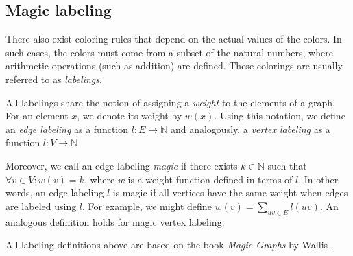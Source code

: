\subsection{Magic labeling}

There also exist coloring rules that depend on the actual values of the colors. In such cases, the colors must come from a subset of the natural numbers, where arithmetic operations (such as addition) are defined. These colorings are usually referred to as \textit{labelings}.

All labelings share the notion of assigning a \textit{weight} to the elements of a graph. For an element $x$, we denote its weight by $w(x)$. Using this notation, we define an \textit{edge labeling} as a function $l : E \rightarrow \mathbb{N}$ and analogously, a \textit{vertex labeling} as a function $l : V \rightarrow \mathbb{N}$

Moreover, we call an edge labeling \textit{magic} if there exists $k \in \mathbb{N}$ such that $\forall v \in V: w(v) = k$, where $w$ is a weight function defined in terms of $l$. In other words, an edge labeling $l$ is magic if all vertices have the same weight when edges are labeled using $l$. For example, we might define $w(v) = \sum_{uv \in E} l(uv)$. An analogous definition holds for magic vertex labeling.

All labeling definitions above are based on the book \textit{Magic Graphs} by Wallis \cite{marrwall2013}.